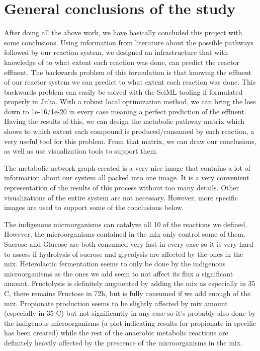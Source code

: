 \documentclass[11pt]{article}
\begin{document}
\section{General conclusions of the study}
\label{sec:orgf66268f}
After doing all the above work, we have basically concluded this project with some conclusions. Using information from literature about the possible pathways followed by our reaction system, we designed an infrastructure that with knowledge of to what extent each reaction was done, can predict the reactor effluent. The backwards problem of this formulation is that knowing the effluent of our reactor system we can predict to what extent each reaction was done. This backwards problem can easily be solved with the SciML tooling if formulated properly in Julia. With a robust local optimization method, we can bring the loss down to 1e-16/1e-20 in every case meaning a perfect prediction of the effluent. Having the results of this, we can design the metabolic pathway matrix which shows to which extent each compound is produced/consumed by each reaction, a very useful tool for this problem. From that matrix, we can draw our conclusions, as well as use visualization tools to support them.

The metabolic network graph created is a very nice image that contains a lot of information about our system all packed into one image. It is a very convenient representation of the results of this process without too many details. Other visualizations of the entire system are not necessary. However, more specific images are used to support some of the conclusions below.

The indigenous microorganisms can catalyze all 10 of the reactions we defined. However, the microorganisms contained in the mix only control some of them. Sucrose and Glucose are both consumed very fast in every case so it is very hard to assess if hydrolysis of sucrose and glycolysis are affected by the ones in the mix.
Heterolactic fermentation seems to only be done by the indigenous microorganisms as the ones we add seem to not affect its flux a significant amount. Fructolysis is definitely augmented by adding the mix as especially in 35 C, there remains Fructose in 72h, but is fully consumed if we add enough of the mix. Propionate production seems to be slightly affected by mix amount (especially in 35 C) but not significantly in any case so it's probably also done by the indigenous microorganisms (a plot indicating results for propionate in specific has been created) while the rest of the anaerobic metabolic reactions are definitely heavily affected by the prescence of the microorganisms in the mix.
\end{document}

